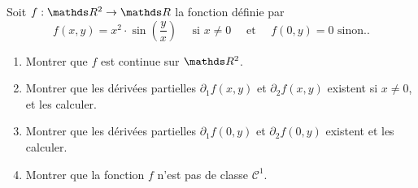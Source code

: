 \begin{exo}
	\begin{slshape}
		Soit $f : \R^2 \to \R$ la fonction définie par \[
			f(x,y) = x^2 \cdot \sin \left( \frac{y}{x} \right) \quad \text{ si } x \neq 0 \quad \text{ et }\quad f(0, y) = 0 \text{ sinon}.
		.\]
		\begin{enumerate}
			\item Montrer que $f$ est continue sur $\R^2$.
			\item Montrer que les dérivées partielles $\partial_1 f(x,y)$ et $\partial_2 f(x,y)$ existent si $x \neq 0$, et les calculer.
			\item Montrer que les dérivées partielles $\partial_1 f(0,y)$ et $\partial_2 f(0,y)$ existent et les calculer.
			\item Montrer que la fonction $f$ n'est pas de classe $\mathcal{C}^1$.
		\end{enumerate}
	\end{slshape}


\end{exo}
